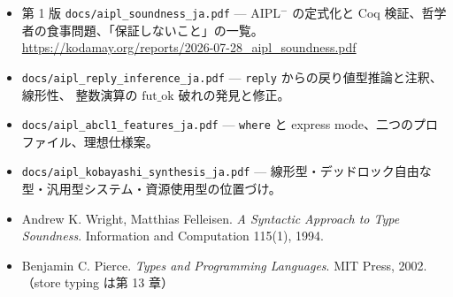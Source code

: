 \documentclass[11pt,a4paper]{ltjsarticle}
\theoremstyle{definition}
\theoremstyle{remark}
\newcommand{\futok}{\mathrm{fut\_ok}}
\begin{document}
\begin{itemize}
\item 第 1 版 \texttt{docs/aipl\_soundness\_ja.pdf} ---
  AIPL$^-$ の定式化と Coq 検証、哲学者の食事問題、「保証しないこと」の一覧。
  \url{https://kodamay.org/reports/2026-07-28_aipl_soundness.pdf}
\item \texttt{docs/aipl\_reply\_inference\_ja.pdf} ---
  \texttt{reply} からの戻り値型推論と注釈、線形性、
  整数演算の $\futok$ 破れの発見と修正。
\item \texttt{docs/aipl\_abcl1\_features\_ja.pdf} ---
  \texttt{where} と express mode、二つのプロファイル、理想仕様案。
\item \texttt{docs/aipl\_kobayashi\_synthesis\_ja.pdf} ---
  線形型・デッドロック自由な型・汎用型システム・資源使用型の位置づけ。
\item Andrew K. Wright, Matthias Felleisen.
  \emph{A Syntactic Approach to Type Soundness}.
  Information and Computation 115(1), 1994.
\item Benjamin C. Pierce. \emph{Types and Programming Languages}.
  MIT Press, 2002.（store typing は第 13 章）
\end{itemize}
\end{document}

